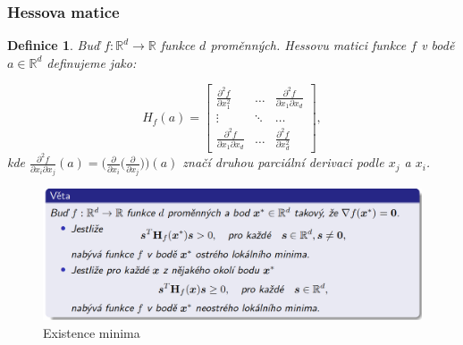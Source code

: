 \documentclass[12pt]{article}
\newtheorem{theorem}{Definice}
\begin{document}
\subsubsection*{Hessova matice}
\begin{theorem}
Buď $f:\mathbb{R}^d\rightarrow\mathbb{R}$ funkce $d$ proměnných. Hessovu matici funkce $f$ v bodě $a\in\mathbb{R}^d$ definujeme jako:

\begin{equation}
	H_f(a)=
	\begin{bmatrix}
   \frac{\partial^2 f}{\partial x_1^2} & \ldots &  \frac{\partial^2 f}{\partial x_1 \partial x_d}\\
   \vdots  & \ddots & \ldots\\
      \frac{\partial^2 f}{\partial x_1 \partial x_d} & \ldots &  \frac{\partial^2 f}{\partial x_d^2}
 \end{bmatrix},
\end{equation}
kde $\frac{\partial^2f}{\partial x_i \partial x_j}(a)=
\big(\frac{\partial}{\partial x_i}\big( \frac{\partial}{\partial x_j} \big)\big)(a)$ značí druhou parciální derivaci podle $x_j$ a $x_i$.
\end{theorem}

\begin{figure}[h]
\includegraphics[width=\linewidth]{lokalni_extrem}
\caption{Existence minima}\label{pic:min}
\end{figure}
\end{document}

